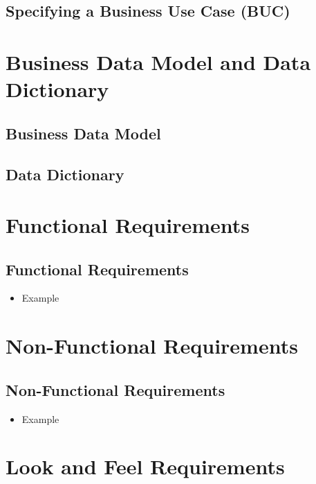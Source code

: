 \documentclass[12pt]{article}
\begin{document}
  \subsection{Specifying a Business Use Case (BUC)}

\section{Business Data Model and Data Dictionary}
  \subsection{Business Data Model}
  \subsection{Data Dictionary}

\section{Functional Requirements}
  \subsection{Functional Requirements}
    \begin{itemize}
        \item Example
    \end{itemize}

\section{Non-Functional Requirements}
  \subsection{Non-Functional Requirements}
    \begin{itemize}
        \item Example
      \end{itemize}

\section{Look and Feel Requirements}
\end{document}
